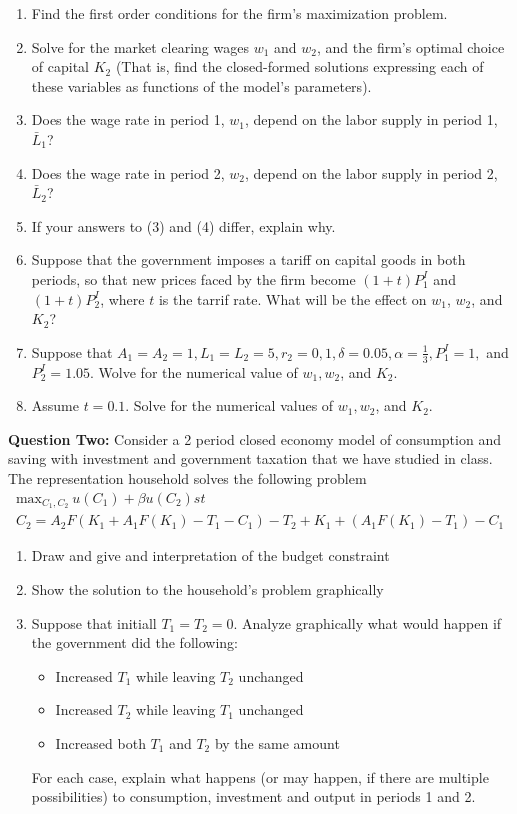 \documentclass[11pt]{SelfArxOneColBMN}
\begin{document}
\begin{enumerate}
  \item Find the first order conditions for the firm's maximization problem.
  \item Solve for the market clearing wages $w_1$ and $w_2$, and the firm's optimal choice of capital $K_2$ (That is, find the closed-formed solutions expressing each of these variables as functions of the model's parameters).
  \item Does the wage rate in period 1, $w_1$, depend on the labor supply in period 1, $\bar{L}_1$?
  \item Does the wage rate in period 2, $w_2$, depend on the labor supply in period 2, $\bar{L}_2$?
  \item If your answers to (3) and (4) differ, explain why.
  \item Suppose that the government imposes a tariff on capital goods in both periods, so that new prices faced by the firm become $(1 + t)P_1^I$ and $(1 + t)P_2^I$, where $t$ is the tarrif rate. What will be the effect on $w_1$, $w_2$, and $K_2$?
  \item Suppose that $A_1 = A_2 = 1, L_1 = L_2 = 5, r_2 = 0,1, \delta = 0.05, \alpha = \frac{1}{3}, P_1^I = 1,$ and $P_2^I = 1.05$. Wolve for the numerical value of $w_1, w_2$, and $K_2$.
  \item Assume $t = 0.1$. Solve for the numerical values of $w_1, w_2$, and $K_2$.
\end{enumerate}
\bigskip
\textbf{Question Two:}
Consider a 2 period closed economy model of consumption and saving with investment and government taxation that we have studied in class. The representation household solves the following problem
\begin{eqnarray*}
  \text{max}_{C_1,C_2}\: u(C_1) + \beta u(C_2) st\\
  C_2 = A_2F(K_1 + A_1F(K_1) - T_1 - C_1) - T_2 + K_1 + (A_1F(K_1) - T_1) - C_1
\end{eqnarray*}
\begin{enumerate}
  \item Draw and give and interpretation of the budget constraint
  \item Show the solution to the household's problem graphically
  \item Suppose that initiall $T_1 = T_2 = 0$. Analyze graphically what would happen if the government did the following:
  \begin{itemize}
    \item Increased $T_1$ while leaving $T_2$ unchanged
    \item Increased $T_2$ while leaving $T_1$ unchanged
    \item Increased both $T_1$ and $T_2$ by the same amount
  \end{itemize}
  \indent For each case, explain what happens (or may happen, if there are multiple possibilities) to consumption, investment and output in periods 1 and 2. 
\end{enumerate}
\end{document}
